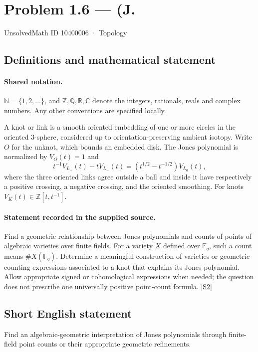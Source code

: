 \documentclass[11pt]{article}
\newcommand{\sref}[2]{\hyperlink{source:#1:#2}{[S#2]}}
\begin{document}
\setcounter{section}{10400005}
\section{Problem 1.6 — (J.}\label{10400006}
{\small\sffamily UnsolvedMath ID 10400006 · Topology}
\subsection{Definitions and mathematical statement}

\paragraph{Shared notation.}$\mathbb N=\{1,2,\ldots\}$, and $\mathbb Z,\mathbb Q,\mathbb R,\mathbb C$ denote the integers, rationals, reals and complex numbers. Any other conventions are specified locally.


A knot or link is a smooth oriented embedding of one or more circles in the oriented $3$-sphere, considered up to orientation-preserving ambient isotopy. Write $O$ for the unknot, which bounds an embedded disk. The Jones polynomial is normalized by $V_O(t)=1$ and
\[t^{-1}V_{L_+}(t)-tV_{L_-}(t)=(t^{1/2}-t^{-1/2})V_{L_0}(t),\]
where the three oriented links agree outside a ball and inside it have respectively a positive crossing, a negative crossing, and the oriented smoothing. For knots $V_K(t)\in\mathbb Z[t,t^{-1}]$.
\paragraph{Statement recorded in the supplied source.}
Find a geometric relationship between Jones polynomials and counts of points of algebraic varieties over finite fields. For a variety $X$ defined over $\mathbb F_q$, such a count means $\#X(\mathbb F_q)$. Determine a meaningful construction of varieties or geometric counting expressions associated to a knot that explains its Jones polynomial. Allow appropriate signed or cohomological expressions when needed; the question does not prescribe one universally positive point-count formula. \sref{10400006}{2}
\subsection{Short English statement}
Find an algebraic-geometric interpretation of Jones polynomials through finite-field point counts or their appropriate geometric refinements.
\end{document}
